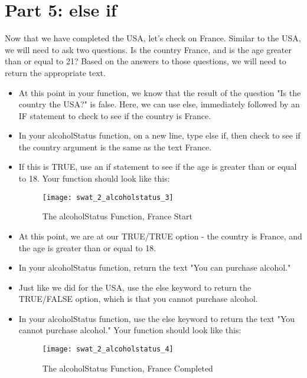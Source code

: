 \documentclass{article}
\begin{document}
\section*{Part 5: else if}
Now that we have completed the USA, let's check on France.  Similar to the USA, we will need to ask two questions.  Is the country France, and is the age greater than or equal to 21?  Based on the answers to those questions, we will need to return the appropriate text.
\begin{itemize}
	\item At this point in your function, we know that the result of the question "Is the country the USA?" is false.  Here, we can use else, immediately followed by an IF statement to check to see if the country is France.
	\item In your alcoholStatus function, on a new line, type else if, then check to see if the country argument is the same as the text France.
	\item If this is TRUE, use an if statement to see if the age is greater than or equal to 18.  Your function should look like this:
	\begin{figure}[H]
  		\centering
  		\texttt{[image: swat\_2\_alcoholstatus\_3]}
  		\caption{The alcoholStatus Function, France Start}
	\end{figure}
	\item At this point, we are at our TRUE/TRUE option - the country is France, and the age is greater than or equal to 18.
	\item In your alcoholStatus function, return the text "You can purchase alcohol."
	\item Just like we did for the USA, use the else keyword to return the TRUE/FALSE option, which is that you cannot purchase alcohol.
	\item In your alcoholStatus function, use the else keyword to return the text "You cannot purchase alcohol."  Your function should look like this:
	\begin{figure}[H]
  		\centering
  		\texttt{[image: swat\_2\_alcoholstatus\_4]}
  		\caption{The alcoholStatus Function, France Completed}
	\end{figure}
\end{itemize}
\end{document}
